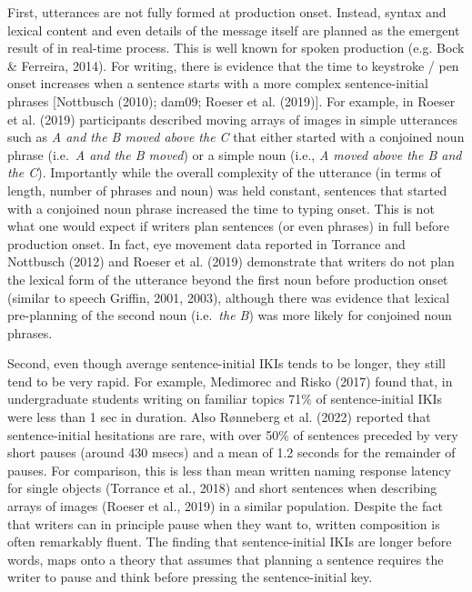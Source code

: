 \documentclass[
  english,
  man,floatsintext]{apa7}
\begin{document}
First, utterances are not fully formed at production onset. Instead, syntax and lexical content and even details of the message itself are planned as the emergent result of in real-time process. This is well known for spoken production (e.g. Bock \& Ferreira, 2014). For writing, there is evidence that the time to keystroke / pen onset increases when a sentence starts with a more complex sentence-initial phrases {[}Nottbusch (2010); dam09; Roeser et al. (2019){]}. For example, in Roeser et al. (2019) participants described moving arrays of images in simple utterances such as \emph{A and the B moved above the C} that either started with a conjoined noun phrase (i.e.~\emph{A and the B moved}) or a simple noun (i.e., \emph{A moved above the B and the C}). Importantly while the overall complexity of the utterance (in terms of length, number of phrases and noun) was held constant, sentences that started with a conjoined noun phrase increased the time to typing onset. This is not what one would expect if writers plan sentences (or even phrases) in full before production onset. In fact, eye movement data reported in Torrance and Nottbusch (2012) and Roeser et al. (2019) demonstrate that writers do not plan the lexical form of the utterance beyond the first noun before production onset (similar to speech Griffin, 2001, 2003), although there was evidence that lexical pre-planning of the second noun (i.e.~\emph{the B}) was more likely for conjoined noun phrases.

Second, even though average sentence-initial IKIs tends to be longer, they still tend to be very rapid. For example, Medimorec and Risko (2017) found that, in undergraduate students writing on familiar topics 71\% of sentence-initial IKIs were less than 1 sec in duration. Also Rønneberg et al. (2022) reported that sentence-initial hesitations are rare, with over 50\% of sentences preceded by very short pauses (around 430 msecs) and a mean of 1.2 seconds for the remainder of pauses. For comparison, this is less than mean written naming response latency for single objects (Torrance et al., 2018) and short sentences when describing arrays of images (Roeser et al., 2019) in a similar population. Despite the fact that writers can in principle pause when they want to, written composition is often remarkably fluent. The finding that sentence-initial IKIs are longer before words, maps onto a theory that assumes that planning a sentence requires the writer to pause and think before pressing the sentence-initial key.
\end{document}
